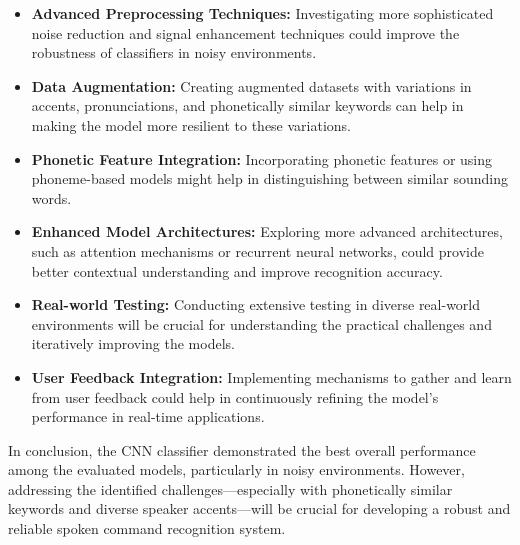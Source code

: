 \begin{itemize}
    \item \textbf{Advanced Preprocessing Techniques:} Investigating more sophisticated noise reduction and signal enhancement techniques could improve the robustness of classifiers in noisy environments.

    \item \textbf{Data Augmentation:} Creating augmented datasets with variations in accents, pronunciations, and phonetically similar keywords can help in making the model more resilient to these variations.

    \item \textbf{Phonetic Feature Integration:} Incorporating phonetic features or using phoneme-based models might help in distinguishing between similar sounding words.

    \item \textbf{Enhanced Model Architectures:} Exploring more advanced architectures, such as attention mechanisms or recurrent neural networks, could provide better contextual understanding and improve recognition accuracy.

    \item \textbf{Real-world Testing:} Conducting extensive testing in diverse real-world environments will be crucial for understanding the practical challenges and iteratively improving the models.

    \item \textbf{User Feedback Integration:} Implementing mechanisms to gather and learn from user feedback could help in continuously refining the model's performance in real-time applications.
\end{itemize}

In conclusion, the CNN classifier demonstrated the best overall performance among the evaluated models, particularly in noisy environments. However, addressing the identified challenges—especially with phonetically similar keywords and diverse speaker accents—will be crucial for developing a robust and reliable spoken command recognition system.
